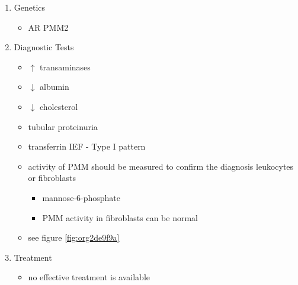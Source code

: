 \documentclass[12pt]{scrartcl}
\begin{document}
\begin{enumerate}
\begin{itemize}

\item GDP-mannose is used in the ER to assemble the dolichol-pyrophosphate
oligosaccharide precursor
\item defect leads to hypoglycosylation
\item deficiency and/or dysfunction of numerous glycoproteins:
\begin{itemize}
\item serum proteins:
\begin{itemize}
\item thyroxin-binding globulin, haptoglobin, clotting factor XI,
antithrombin III, cholinesterase
\end{itemize}
\item lysosomal enzymes
\item membrane bound glycoproteins
\end{itemize}
\end{itemize}

\item Genetics
\label{sec:org02f4977}
\begin{itemize}
\item AR PMM2
\end{itemize}

\item Diagnostic Tests
\label{sec:org667b6bb}
\begin{itemize}
\item \(\uparrow\) transaminases
\item \(\downarrow\) albumin
\item \(\downarrow\) cholesterol
\item tubular proteinuria
\item transferrin IEF - Type I pattern
\item activity of PMM should be measured to confirm the diagnosis
leukocytes or fibroblasts
\begin{itemize}
\item\relax [2-H\textsuperscript{3}]mannose-6-phosphate
\item PMM activity in fibroblasts can be normal
\end{itemize}
\item see figure \ref{fig:org2de9f9a}
\end{itemize}

\item Treatment
\label{sec:org2afa47a}
\begin{itemize}
\item no effective treatment is available
\end{itemize}
\end{enumerate}
\end{document}
